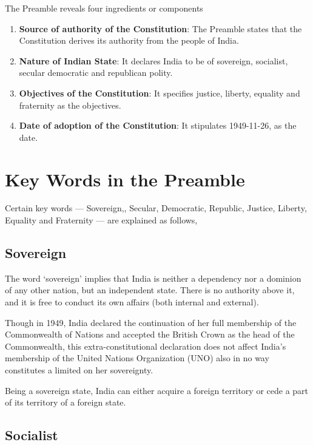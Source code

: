 The Preamble reveals four ingredients or components

\begin{enumerate}
  \item \textbf{Source of authority of the Constitution}: The Preamble states that the Constitution derives its authority from the people of India.
  \item \textbf{Nature of Indian State}: It declares India to be of sovereign, socialist, secular democratic and republican polity.
  \item \textbf{Objectives of the Constitution}: It specifies justice, liberty, equality and fraternity as the objectives.
  \item \textbf{Date of adoption of the Constitution}: It stipulates 1949-11-26, as the date.
\end{enumerate}


\section{Key Words in the Preamble}

Certain key words — Sovereign,, Secular, Democratic, Republic, Justice, Liberty, Equality and Fraternity — are explained as follows,

\subsection{Sovereign}

The word `sovereign' implies that India is neither a dependency nor a dominion of any other nation, but an independent state\endnote. There is no authority above it, and it is free to conduct its own affairs (both internal and external).

Though in 1949, India declared the continuation of her full membership of the Commonwealth of Nations and accepted the British Crown as the head of the Commonwealth, this extra-constitutional declaration does not affect India's membership of the United Nations Organization (UNO) also in no way constitutes a limited on her sovereignty\endnote.

Being a sovereign state, India can either acquire a foreign territory or cede a part of its territory of a foreign state.

\subsection{Socialist}

